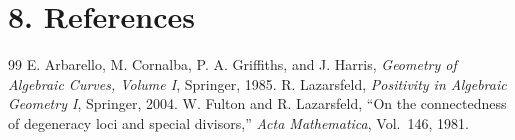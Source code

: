 \section*{8. References}
\begin{thebibliography}{99}
 E. Arbarello, M. Cornalba, P. A. Griffiths, and J. Harris, \emph{Geometry of Algebraic Curves, Volume I}, Springer, 1985.
 R. Lazarsfeld, \emph{Positivity in Algebraic Geometry I}, Springer, 2004.
 W. Fulton and R. Lazarsfeld, ``On the connectedness of degeneracy loci and special divisors,'' \emph{Acta Mathematica}, Vol.~146, 1981.
\end{thebibliography}
